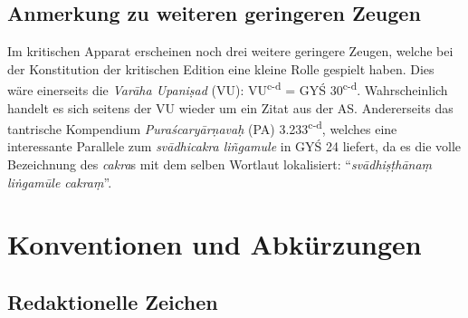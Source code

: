 \documentclass[a4paper,12pt]{article}
\begin{document}
\subsection{Anmerkung zu weiteren geringeren Zeugen}

Im kritischen Apparat erscheinen noch drei weitere geringere Zeugen, welche bei der Konstitution der kritischen Edition eine kleine Rolle gespielt haben. Dies wäre einerseits die \textit{Varāha Upaniṣad} (VU): VU\textsuperscript{c-d} = GYŚ 30\textsuperscript{c-d}. Wahrscheinlich handelt es sich seitens der VU wieder um ein Zitat aus der AS. Andererseits das tantrische Kompendium \textit{Puraścaryārṇavaḥ} (PA) 3.233\textsuperscript{c-d}, welches eine interessante Parallele zum \textit{svādhicakra liñgamule} in GYŚ 24 liefert, da es die volle Bezeichnung des \textit{cakra}s mit dem selben Wortlaut lokalisiert: ``\textit{svādhiṣṭhānaṃ liṅgamūle cakraṃ}''. 

\clearpage

\section{Konventionen und Abkürzungen}
\label{konv}

\subsection{Redaktionelle Zeichen}
\label{redz}
\end{document}
